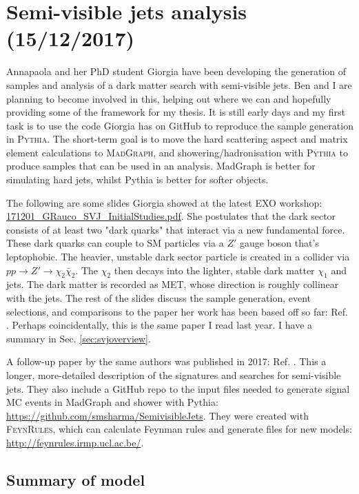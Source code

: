 \newpage
\section{Semi-visible jets analysis (15/12/2017)}

Annapaola and her PhD student Giorgia have been developing the generation of samples and analysis of a dark matter search with semi-visible jets. Ben and I are planning to become involved in this, helping out where we can and hopefully providing some of the framework for my thesis. It is still early days and my first task is to use the code Giorgia has on GitHub to reproduce the sample generation in \textsc{Pythia}. The short-term goal is to move the hard scattering aspect and matrix element calculations to \textsc{MadGraph}, and showering/hadronisation with \textsc{Pythia} to produce samples that can be used in an analysis. MadGraph is better for simulating hard jets, whilst Pythia is better for softer objects.

The following are some slides Giorgia showed at the latest EXO workshop: \href{run:sec35/171201_GRauco_SVJ_InitialStudies.pdf}{171201\_GRauco\_SVJ\_InitialStudies.pdf}. She postulates that the dark sector consists of at least two "dark quarks" that interact via a new fundamental force. These dark quarks can couple to SM particles via a $Z'$ gauge boson that's leptophobic. The heavier, unstable dark sector particle is created in a collider via $pp \rightarrow Z' \rightarrow \chi_2 \bar{\chi}_2$. The $\chi_2$ then decays into the lighter, stable dark matter $\chi_1$ and jets. The dark matter is recorded as MET, whose direction is roughly collinear with the jets. The rest of the slides discuss the sample generation, event selections, and comparisons to the paper her work has been based off so far: Ref. \cite{Cohen:2015toa}. Perhaps coincidentally, this is the same paper I read last year. I have a summary in Sec. \ref{sec:svjoverview}.

A follow-up paper by the same authors was published in 2017: Ref. \cite{Cohen:2017pzm}. This a longer, more-detailed description of the signatures and searches for semi-visible jets. They also include a GitHub repo to the input files needed to generate signal MC events in MadGraph and shower with Pythia: \url{https://github.com/smsharma/SemivisibleJets}. They were created with \textsc{FeynRules}, which can calculate Feynman rules and generate files for new models: \url{http://feynrules.irmp.ucl.ac.be/}.


\subsection{Summary of model}

